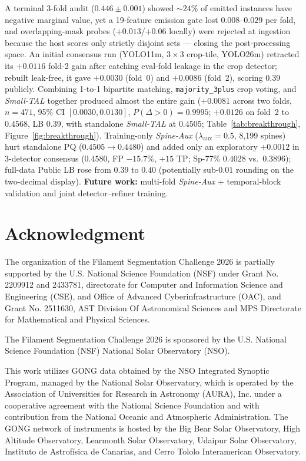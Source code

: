 \documentclass[sigconf]{acmart}
\begin{document}
    A terminal 3-fold audit ($0.446\pm0.001$) showed ${\sim}24\%$ of emitted instances have negative marginal value, yet a 19-feature emission gate lost $0.008$--$0.029$ per fold, and overlapping-mask probes ($+0.013$/$+0.06$ locally) were rejected at ingestion because the host scores only strictly disjoint sets --- closing the post-processing space. An initial consensus run (YOLO11m, $3{\times}3$ crop-tile, YOLO26m) retracted its $+0.0116$ fold-2 gain after catching eval-fold leakage in the crop detector; rebuilt leak-free, it gave $+0.0030$ (fold~0) and $+0.0086$ (fold~2), scoring $0.39$ publicly. Combining 1-to-1 bipartite matching, \texttt{majority\_3plus} crop voting, and \emph{Small-TAL} together produced almost the entire gain ($+0.0081$ across two folds, $n{=}471$, 95\% CI $[0.0030,0.0130]$, $P(\Delta{>}0){=}0.9995$; $+0.0126$ on fold~2 to $0.4568$, LB $0.39$, with standalone \emph{Small-TAL} at $0.4505$; Table~\ref{tab:breakthrough}, Figure~\ref{fig:breakthrough}). Training-only \emph{Spine-Aux} ($\lambda_{\text{aux}}{=}0.5$, 8{,}199 spines) hurt standalone PQ ($0.4505{\rightarrow}0.4480$) and added only an exploratory $+0.0012$ in 3-detector consensus ($0.4580$, FP $-15.7\%$, $+15$ TP; Sp-77\% $0.4028$ vs.\ $0.3896$); full-data Public LB rose from $0.39$ to $\mathbf{0.40}$ (potentially sub-$0.01$ rounding on the two-decimal display). \textbf{Future work:} multi-fold \emph{Spine-Aux} + temporal-block validation and joint detector--refiner training.

\section{Acknowledgment}\label{sec:acknowledgment}
    The organization of the Filament Segmentation Challenge 2026 is partially supported by the U.S. National Science Foundation (NSF) under Grant No. 2209912 and 2433781, directorate for Computer and Information Science and Engineering (CSE), and Office of Advanced Cyberinfrastructure (OAC), and Grant No. 2511630, AST Division Of Astronomical Sciences and MPS Directorate for Mathematical and Physical Sciences.

    The Filament Segmentation Challenge 2026 is sponsored by the U.S. National Science Foundation (NSF) National Solar Observatory (NSO).

    This work utilizes GONG data obtained by the NSO Integrated Synoptic Program, managed by the National Solar Observatory, which is operated by the Association of Universities for Research in Astronomy (AURA), Inc. under a cooperative agreement with the National Science Foundation and with contribution from the National Oceanic and Atmospheric Administration. The GONG network of instruments is hosted by the Big Bear Solar Observatory, High Altitude Observatory, Learmonth Solar Observatory, Udaipur Solar Observatory, Instituto de Astrof\'{i}sica de Canarias, and Cerro Tololo Interamerican Observatory.


{\footnotesize\setlength{\bibsep}{2pt}}
\end{document}
